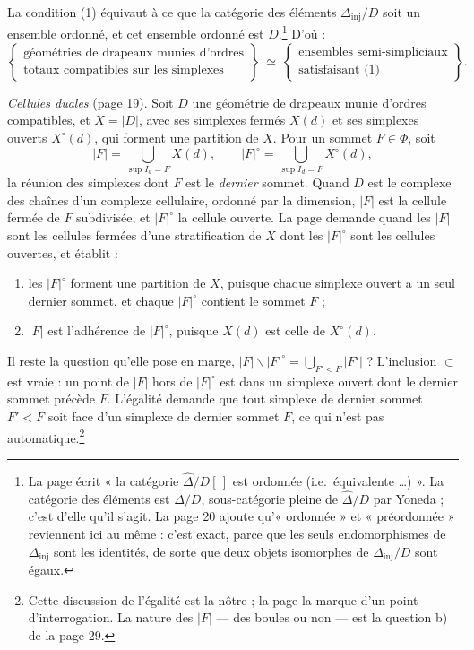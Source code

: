 \documentclass[11pt,a4paper]{article}
\begin{document}
La condition (1) équivaut à ce que la catégorie des éléments
$\Delta_{\mathrm{inj}}/D$ soit un ensemble ordonné, et cet ensemble ordonné
est $D$.\footnote{La page écrit « la catégorie $\widehat{\Delta}/D[\,]$ est
ordonnée (i.e.\ équivalente \ldots) ». La catégorie des éléments est
$\Delta/D$, sous-catégorie pleine de $\widehat{\Delta}/D$ par Yoneda ; c'est
d'elle qu'il s'agit. La page 20 ajoute qu'« ordonnée » et « préordonnée »
reviennent ici au même : c'est exact, parce que les seuls endomorphismes de
$\Delta_{\mathrm{inj}}$ sont les identités, de sorte que deux objets
isomorphes de $\Delta_{\mathrm{inj}}/D$ sont égaux.} D'où :
\[
  \left\{
  \begin{array}{l}
    \text{géométries de drapeaux munies d'ordres}\\
    \text{totaux compatibles sur les simplexes}
  \end{array}
  \right\}
  \ \simeq\
  \left\{
  \begin{array}{l}
    \text{ensembles semi-simpliciaux}\\
    \text{satisfaisant (1)}
  \end{array}
  \right\} .
\]

\emph{Cellules duales} (page 19). Soit $D$ une géométrie de drapeaux munie
d'ordres compatibles, et $X = |D|$, avec ses simplexes fermés $X(d)$ et ses
simplexes ouverts $X^\circ(d)$, qui forment une partition de $X$. Pour un
sommet $F \in \Phi$, soit
\[
  |F| = \bigcup_{\sup I_d = F} X(d) , \qquad
  |F|^\circ = \bigcup_{\sup I_d = F} X^\circ(d) ,
\]
la réunion des simplexes dont $F$ est le \emph{dernier} sommet. Quand $D$ est
le complexe des chaînes d'un complexe cellulaire, ordonné par la dimension,
$|F|$ est la cellule fermée de $F$ subdivisée, et $|F|^\circ$ la cellule
ouverte. La page demande quand les $|F|$ sont les cellules fermées d'une
stratification de $X$ dont les $|F|^\circ$ sont les cellules ouvertes, et
établit :
\begin{enumerate}
  \item[a)] les $|F|^\circ$ forment une partition de $X$, puisque chaque
  simplexe ouvert a un seul dernier sommet, et chaque $|F|^\circ$ contient le
  sommet $F$ ;
  \item[b)] $|F|$ est l'adhérence de $|F|^\circ$, puisque $X(d)$ est celle de
  $X^\circ(d)$.
\end{enumerate}
Il reste la question qu'elle pose en marge, $|F| \smallsetminus |F|^\circ =
\bigcup_{F' < F} |F'|$ ? L'inclusion $\subset$ est vraie : un point de $|F|$
hors de $|F|^\circ$ est dans un simplexe ouvert dont le dernier sommet précède
$F$. L'égalité demande que tout simplexe de dernier sommet $F' < F$ soit face
d'un simplexe de dernier sommet $F$, ce qui n'est pas
automatique.\footnote{Cette discussion de l'égalité est la nôtre ; la page la
marque d'un point d'interrogation. La nature des $|F|$ --- des boules ou
non --- est la question b) de la page 29.}
\end{document}

